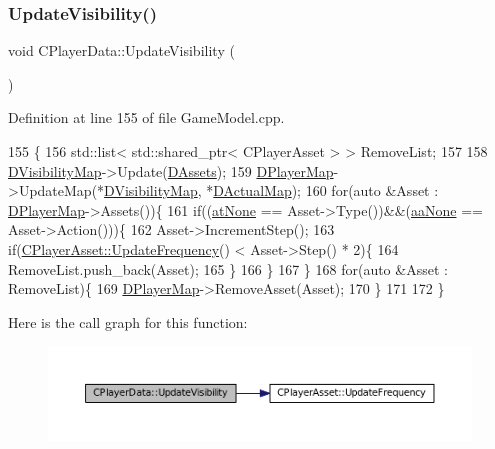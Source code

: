 \subsubsection{\texorpdfstring{Update\+Visibility()}{UpdateVisibility()}}
{\footnotesize\ttfamily void C\+Player\+Data\+::\+Update\+Visibility (\begin{DoxyParamCaption}{ }\end{DoxyParamCaption})}



Definition at line 155 of file Game\+Model.\+cpp.


\begin{DoxyCode}
155                                   \{
156     std::list< std::shared\_ptr< CPlayerAsset > > RemoveList;
157     
158     \hyperlink{classCPlayerData_a804ea65e7ec7c90b2e335414d106cc78}{DVisibilityMap}->Update(\hyperlink{classCPlayerData_a1d7dd355facf52db6242e3554373906c}{DAssets});
159     \hyperlink{classCPlayerData_a452163191cd4603e1e38dd8d4bb9691c}{DPlayerMap}->UpdateMap(*\hyperlink{classCPlayerData_a804ea65e7ec7c90b2e335414d106cc78}{DVisibilityMap}, *\hyperlink{classCPlayerData_a943801106af1d7ad52abd73d32552186}{DActualMap});
160     \textcolor{keywordflow}{for}(\textcolor{keyword}{auto} &Asset : \hyperlink{classCPlayerData_a452163191cd4603e1e38dd8d4bb9691c}{DPlayerMap}->Assets())\{
161         \textcolor{keywordflow}{if}((\hyperlink{GameDataTypes_8h_a5600d4fc433b83300308921974477feca82fb51718e2c00981a2d37bc6fe92593}{atNone} == Asset->Type())&&(\hyperlink{GameDataTypes_8h_ab47668e651a3032cfb9c40ea2d60d670ac17cc5a0035320c060d7f8074143b507}{aaNone} == Asset->Action()))\{
162             Asset->IncrementStep();
163             \textcolor{keywordflow}{if}(\hyperlink{classCPlayerAsset_a0aff85b9552967a42f4f3f42cb59c19f}{CPlayerAsset::UpdateFrequency}() < Asset->Step() * 2)\{
164                 RemoveList.push\_back(Asset);   
165             \}
166         \}
167     \}
168     \textcolor{keywordflow}{for}(\textcolor{keyword}{auto} &Asset : RemoveList)\{
169         \hyperlink{classCPlayerData_a452163191cd4603e1e38dd8d4bb9691c}{DPlayerMap}->RemoveAsset(Asset);     
170     \}
171     
172 \}
\end{DoxyCode}
Here is the call graph for this function\+:
\nopagebreak
\begin{figure}[H]
\begin{center}
\leavevmode
\includegraphics[width=350pt]{classCPlayerData_a3ac1393306e8a3f7c95d13ca01e429a7_cgraph}
\end{center}
\end{figure}
